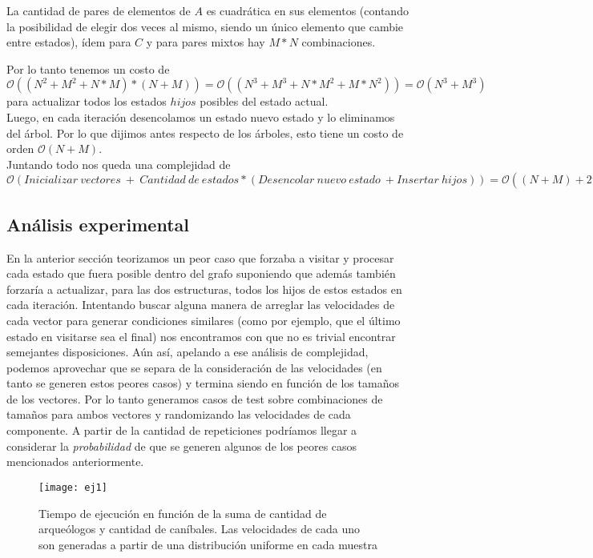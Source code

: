 La cantidad de pares de elementos de $A$ es cuadrática en sus elementos (contando la posibilidad de elegir dos veces al mismo, siendo un único elemento que cambie entre estados), ídem para $C$ y para pares mixtos hay $M*N$ combinaciones.

Por lo tanto tenemos un costo de $\mathcal{O}((N^2+M^2+N*M)*(N+M))=\mathcal{O}((N^3+M^3+N*M^2+M*N^2))=\mathcal{O}(N^3+M^3)$ para actualizar todos los estados $hijos$ posibles del estado actual. \\

Luego, en cada iteración desencolamos un estado nuevo estado y lo eliminamos del árbol. Por lo que dijimos antes respecto de los árboles, esto tiene un costo de orden $\mathcal{O}(N+M)$. \\

Juntando todo nos queda una complejidad de $\mathcal{O}(Inicializar\ vectores\ +\ Cantidad\ de\ estados*(Desencolar\ nuevo\ estado\ + Insertar\ hijos)) = \mathcal{O}((N+M)+2^{N+M}((N+M)+(N^3+M^3))) = \mathcal{O}(\ 2^{N+M}*(N^3+M^3)\ )$

\subsection{Análisis experimental}

En la anterior sección teorizamos un peor caso que forzaba a visitar y procesar cada estado que fuera posible dentro del grafo suponiendo que además también forzaría a actualizar, para las dos estructuras, todos los hijos de estos estados en cada iteración. Intentando buscar alguna manera de arreglar las velocidades de cada vector para generar condiciones similares (como por ejemplo, que el último estado en visitarse sea el final) nos encontramos con que no es trivial encontrar semejantes disposiciones. Aún así, apelando a ese análisis de complejidad, podemos aprovechar que se separa de la consideración de las velocidades (en tanto se generen estos peores casos) y termina siendo en función de los tamaños de los vectores. Por lo tanto generamos casos de test sobre combinaciones de tamaños para ambos vectores y randomizando las velocidades de cada componente. A partir de la cantidad de repeticiones podríamos llegar a considerar la \emph{probabilidad} de que se generen algunos de los peores casos mencionados anteriormente.	
\\

\begin{figure}[H]
    \centering
    \texttt{[image: ej1]}
    \caption{Tiempo de ejecución en función de la suma de cantidad de arqueólogos y cantidad de caníbales. Las velocidades de cada uno son generadas a partir de una distribución uniforme en cada muestra}
    \label{fig:ej1-fig}
\end{figure}

